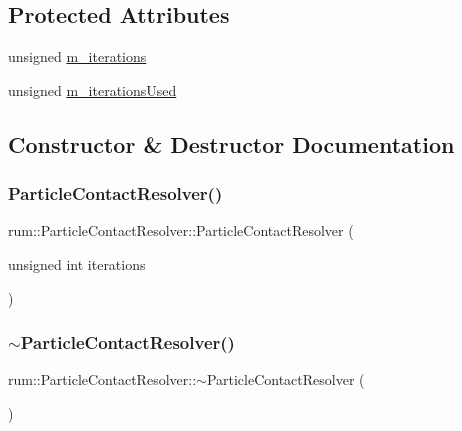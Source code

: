 \subsection*{Protected Attributes}
\begin{DoxyCompactItemize}
\item 
unsigned \mbox{\hyperlink{classrum_1_1_particle_contact_resolver_a123300d59a87b791f53844d992b87ab7}{m\+\_\+iterations}}
\item 
unsigned \mbox{\hyperlink{classrum_1_1_particle_contact_resolver_ab86206e4f42fb6da8b7e6337d393cfdf}{m\+\_\+iterations\+Used}}
\end{DoxyCompactItemize}


\subsection{Constructor \& Destructor Documentation}
\mbox{\label{classrum_1_1_particle_contact_resolver_a1921a5520c8940065d04f3bb890680bc}} 
\subsubsection{\texorpdfstring{Particle\+Contact\+Resolver()}{ParticleContactResolver()}}
{\footnotesize\ttfamily rum\+::\+Particle\+Contact\+Resolver\+::\+Particle\+Contact\+Resolver (\begin{DoxyParamCaption}\item[{unsigned int}]{iterations }\end{DoxyParamCaption})\hspace{0.3cm}{\ttfamily [explicit]}}

\mbox{\label{classrum_1_1_particle_contact_resolver_aa87e6c4d5a737b9882969350c99505b9}} 
\subsubsection{\texorpdfstring{$\sim$\+Particle\+Contact\+Resolver()}{~ParticleContactResolver()}}
{\footnotesize\ttfamily rum\+::\+Particle\+Contact\+Resolver\+::$\sim$\+Particle\+Contact\+Resolver (\begin{DoxyParamCaption}{ }\end{DoxyParamCaption})\hspace{0.3cm}{\ttfamily [default]}}



